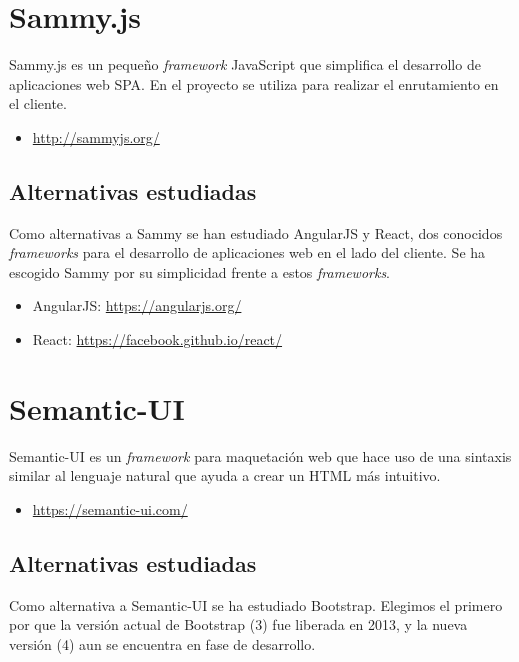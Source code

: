 \section{Sammy.js}

Sammy.js es un pequeño \emph{framework} JavaScript que simplifica el desarrollo de aplicaciones web SPA.
En el proyecto se utiliza para realizar el enrutamiento en el cliente.

\begin{itemize}
	\item \url{http://sammyjs.org/}
\end{itemize}

\subsection{Alternativas estudiadas}

Como alternativas a Sammy se han estudiado AngularJS y React, dos conocidos \emph{frameworks} para el desarrollo de aplicaciones web en el lado del cliente. Se ha escogido Sammy por su simplicidad frente a estos \emph{frameworks}.

\begin{itemize}
	\item AngularJS: \url{https://angularjs.org/}
	\item React: \url{https://facebook.github.io/react/}
\end{itemize}

\section{Semantic-UI}

Semantic-UI es un \emph{framework} para maquetación web que hace uso de una sintaxis similar al lenguaje natural que ayuda a crear un HTML más intuitivo.

\begin{itemize}
	\item \url{https://semantic-ui.com/}
\end{itemize}

\subsection{Alternativas estudiadas}

Como alternativa a Semantic-UI se ha estudiado Bootstrap. Elegimos el primero por que la versión actual de Bootstrap (3) fue liberada en 2013, y la nueva versión (4) aun se encuentra en fase de desarrollo.

